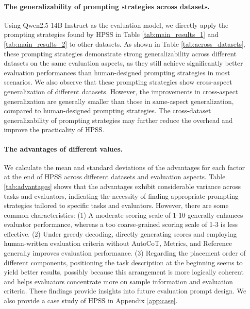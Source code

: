 \paragraph{The generalizability of prompting strategies across datasets.}
Using Qwen2.5-14B-Instruct as the evaluation model, we directly apply the prompting strategies found by HPSS in Table \ref{tab:main_results_1} and \ref{tab:main_results_2} to other datasets. 
As shown in Table \ref{tab:across_datasets}, these prompting strategies demonstrate strong generalizability across different datasets on the same evaluation aspects, 
as they still achieve significantly better evaluation performances than human-designed prompting strategies in most scenarios. 
We also observe that these prompting strategies show cross-aspect generalization of different datasets. 
However, the improvements in cross-aspect generalization are generally smaller than those in same-aspect generalization, compared to human-designed prompting strategies.
The cross-dataset generalizability of prompting strategies may further reduce the overhead and improve the practicality of HPSS.



\paragraph{The advantages of different values.}
We calculate the mean and standard deviations of the advantages for each factor at the end of HPSS across different datasets and evaluation aspects. 
Table \ref{tab:advantages} shows that the advantages exhibit considerable variance across tasks and evaluators, indicating the necessity of finding appropriate prompting strategies tailored to specific tasks and evaluators.
However, there are some common characteristics: 
(1) A moderate scoring scale of 1-10 generally enhances evaluator performance, whereas a too coarse-grained scoring scale of 1-3 is less effective.
(2) Under greedy decoding, directly generating scores and employing human-written evaluation criteria without AutoCoT, Metrics, and Reference generally improves evaluation performance.
(3) Regarding the placement order of different components, positioning the task description at the beginning seems to yield better results, possibly because this arrangement is more logically coherent and helps evaluators concentrate more on sample information and evaluation criteria.
These findings provide insights into future evaluation prompt design.
We also provide a case study of HPSS in Appendix \ref{app:case}.


